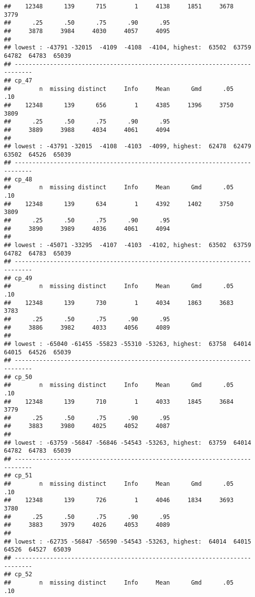 \documentclass[]{article}
\begin{document}
\begin{verbatim}
##    12348      139      715        1     4138     1851     3678     3779 
##      .25      .50      .75      .90      .95 
##     3878     3984     4030     4057     4095 
## 
## lowest : -43791 -32015  -4109  -4108  -4104, highest:  63502  63759  64782  64783  65039
## ---------------------------------------------------------------------------
## cp_47 
##        n  missing distinct     Info     Mean      Gmd      .05      .10 
##    12348      139      656        1     4385     1396     3750     3809 
##      .25      .50      .75      .90      .95 
##     3889     3988     4034     4061     4094 
## 
## lowest : -43791 -32015  -4108  -4103  -4099, highest:  62478  62479  63502  64526  65039
## ---------------------------------------------------------------------------
## cp_48 
##        n  missing distinct     Info     Mean      Gmd      .05      .10 
##    12348      139      634        1     4392     1402     3750     3809 
##      .25      .50      .75      .90      .95 
##     3890     3989     4036     4061     4094 
## 
## lowest : -45071 -33295  -4107  -4103  -4102, highest:  63502  63759  64782  64783  65039
## ---------------------------------------------------------------------------
## cp_49 
##        n  missing distinct     Info     Mean      Gmd      .05      .10 
##    12348      139      730        1     4034     1863     3683     3783 
##      .25      .50      .75      .90      .95 
##     3886     3982     4033     4056     4089 
## 
## lowest : -65040 -61455 -55823 -55310 -53263, highest:  63758  64014  64015  64526  65039
## ---------------------------------------------------------------------------
## cp_50 
##        n  missing distinct     Info     Mean      Gmd      .05      .10 
##    12348      139      710        1     4033     1845     3684     3779 
##      .25      .50      .75      .90      .95 
##     3883     3980     4025     4052     4087 
## 
## lowest : -63759 -56847 -56846 -54543 -53263, highest:  63759  64014  64782  64783  65039
## ---------------------------------------------------------------------------
## cp_51 
##        n  missing distinct     Info     Mean      Gmd      .05      .10 
##    12348      139      726        1     4046     1834     3693     3780 
##      .25      .50      .75      .90      .95 
##     3883     3979     4026     4053     4089 
## 
## lowest : -62735 -56847 -56590 -54543 -53263, highest:  64014  64015  64526  64527  65039
## ---------------------------------------------------------------------------
## cp_52 
##        n  missing distinct     Info     Mean      Gmd      .05      .10 

\end{verbatim}
\end{document}
